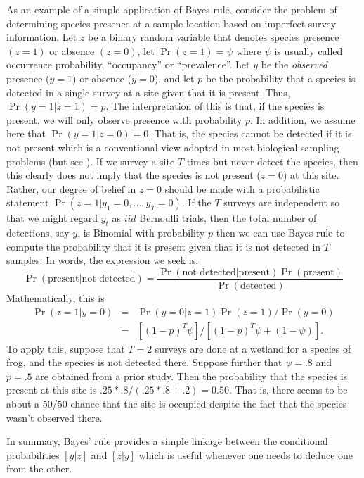 As an example of a simple application of Bayes rule,
consider the problem of determining species presence at a sample
location based on imperfect survey information. Let $z$ be a binary
random variable that denotes species presence $(z=1)$ or absence
$(z=0)$, let $\Pr(z=1) = \psi$ where $\psi$ is usually called
occurrence probability, ``occupancy'' \citep{mackenzie_etal:2002} or ``prevalence''.
Let $y$ be the {\it observed} presence
($y=1$) or absence ($y=0$), and let $p$ be the probability that a
species is detected in a single survey at a site given that it is
present. Thus, $\Pr(y=1|z=1)=p$. The interpretation of this is that,
if the species is present, we will only observe presence with
probability $p$. In addition, we assume here that $\Pr(y=1|z=0) =
0$. That is, the species cannot be detected if it is not present which
is a conventional view adopted in most biological sampling problems (but
see \citet{royle_link:2006}).
If we survey a site $T$ times but never detect the species,
then this clearly does not imply that the species is not present
($z=0$) at this site. Rather, our degree of belief in $z=0$ should be
made with a probabilistic statement
$\Pr(z=1|y_1=0,\ldots,y_{T}=0)$. If the $T$ surveys are independent so
that we might regard $y_{t}$ as $iid$ Bernoulli trials, then the total
number of detections, say $y$, is Binomial with probability $p$ then
we can use Bayes rule to compute the probability that it is present
given that it is not detected in $T$ samples. In words, the expression
we seek is:
\[
\Pr(\mbox{present} | \mbox{not detected}) = \frac{\Pr(\mbox{not detected} |
  \mbox{present})\Pr(\mbox{present})}{\Pr(\mbox{detected})}
\]
Mathematically, this is
\begin{eqnarray*}
\Pr(z=1|y=0) &= &\Pr(y=0|z=1)\Pr(z=1)/\Pr(y=0)  \\
             &= & [(1-p)^{T} \psi]/[ (1-p)^T \psi + (1-\psi) ].
\end{eqnarray*}
To apply this,
suppose that $T=2$ surveys are done at a wetland for a species of
frog, and the species is not detected there. Suppose further that $\psi
= .8$ and $p = .5$ are obtained from a prior study.  Then the
probability that the species is present at this site is
$.25*.8/(.25*.8 + .2) = 0.50$. That is, there seems to be about a
50/50 chance that the site is occupied despite the fact that the
species wasn't observed there.

In summary, Bayes' rule provides a simple linkage between the
conditional probabilities $[y|z]$ and $[z|y]$ which is useful whenever
one needs to deduce one from the other.

